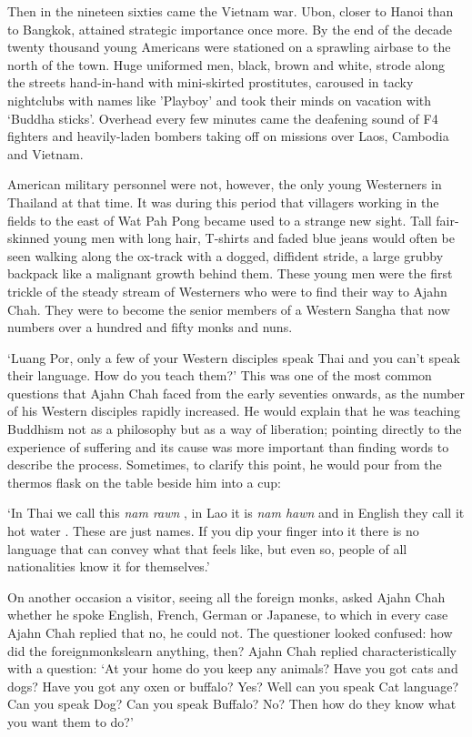 Then in the nineteen sixties came the Vietnam war. Ubon, closer to Hanoi
than to Bangkok, attained strategic importance once more. By the end of
the decade twenty thousand young Americans were stationed on a sprawling
airbase to the north of the town. Huge uniformed men, black, brown and
white, strode along the streets hand-in-hand with mini-skirted
prostitutes, caroused in tacky nightclubs with names like 'Playboy' and
took their minds on vacation with `Buddha sticks'. Overhead every few
minutes came the deafening sound of F4 fighters and heavily-laden
bombers taking off on missions over Laos, Cambodia and Vietnam.

American military personnel were not, however, the only young Westerners
in Thailand at that time. It was during this period that villagers
working in the fields to the east of Wat Pah Pong became used to a
strange new sight. Tall fair-skinned young men with long hair, T-shirts
and faded blue jeans would often be seen walking along the ox-track with
a dogged, diffident stride, a large grubby backpack like a malignant
growth behind them. These young men were the first trickle of the steady
stream of Westerners who were to find their way to Ajahn Chah. They were
to become the senior members of a Western Sangha that now numbers over a
hundred and fifty monks and nuns.

`Luang Por, only a few of your Western disciples speak Thai and you
can't speak their language. How do you teach them?' This was one of the
most common questions that Ajahn Chah faced from the early seventies
onwards, as the number of his Western disciples rapidly increased. He
would explain that he was teaching Buddhism not as a philosophy but as a
way of liberation; pointing directly to the experience of suffering and
its cause was more important than finding words to describe the process.
Sometimes, to clarify this point, he would pour from the thermos flask
on the table beside him into a cup:

`In Thai we call this \emph{nam rawn} , in Lao it is \emph{nam hawn} and
in English they call it hot water . These are just names. If you dip
your finger into it there is no language that can convey what that feels
like, but even so, people of all nationalities know it for themselves.'

On another occasion a visitor, seeing all the foreign monks, asked Ajahn
Chah whether he spoke English, French, German or Japanese, to which in
every case Ajahn Chah replied that no, he could not. The questioner
looked confused: how did the foreignmonkslearn anything, then? Ajahn
Chah replied characteristically with a question: `At your home do you
keep any animals? Have you got cats and dogs? Have you got any oxen or
buffalo? Yes? Well can you speak Cat language? Can you speak Dog? Can
you speak Buffalo? No? Then how do they know what you want them to do?'


